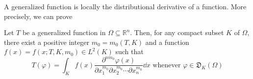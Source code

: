 \label{sec:III.11}

A generalized function is locally the distributional derivative of a function. More precisely, we can prove 

\begin{theoremn} Let $T$ be a generalized function in $\Omega \subseteq \mathbb{R}^{n}$. Then, for any compact subset $K$ of $\Omega$, there exist a positive integer $m_0 = m_0(T, K)$ and a function $f(x) = f(x; T, K, m_0) \in L^2(K)$ such that
\begin{equation}\label{eq:III.11.1}
T (\varphi) = \int_{K} f (x) \frac {\partial^ {n m _{0}} \varphi (x)}{\partial x _{1} ^ {m _{0}} \partial x _{2} ^ {m _{0}} \cdots \partial x _{n} ^ {m _{0}}} \dd x \text{ whenever } \varphi \in \mathfrak {D} _{K} (\Omega)
\end{equation}

\end{theoremn}
